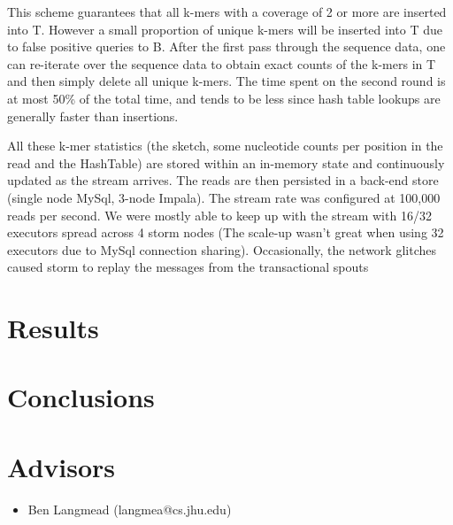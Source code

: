 \documentclass[11pt]{article}
\begin{document}
This scheme guarantees that all k-mers with a coverage of 2 or more are inserted into T. However a small proportion of unique k-mers will be inserted into T due to false positive queries to B. After the first pass through the sequence data, one can re-iterate over the sequence data to obtain exact counts of the k-mers in T and then simply delete all unique k-mers. The time spent on the second round is at most 50\% of the total time, and tends to be less since hash table lookups are generally faster than insertions. 

All these k-mer statistics (the sketch, some nucleotide counts per position in the read and the HashTable) are stored within an in-memory state and continuously updated as the stream arrives. The reads are then persisted in a back-end store (single node MySql, 3-node Impala). The stream rate was configured at 100,000 reads per second. We were mostly able to keep up with the stream with 16/32 executors spread across 4 storm nodes (The scale-up wasn't great when using 32 executors due to MySql connection sharing). Occasionally, the network glitches caused storm to replay the messages from the transactional spouts 

\section{Results}

\section{Conclusions}

\section{Advisors}
\begin{itemize}
	\item Ben Langmead (langmea@cs.jhu.edu)
\end{itemize}


\nocite{*}


\end{document}
